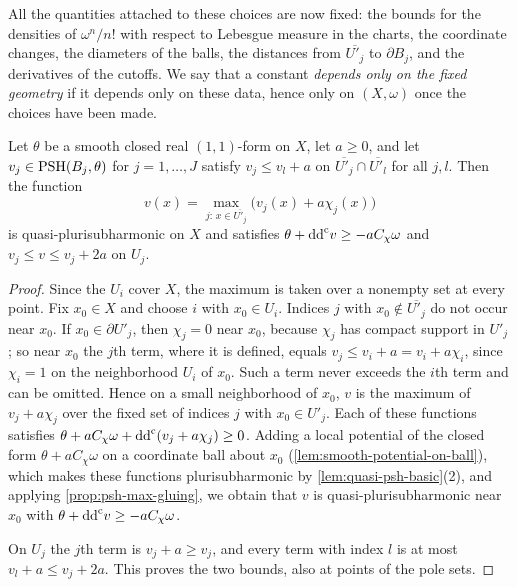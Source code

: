 All the quantities attached to these choices are now fixed: the bounds for the densities of $\omega^n/n!$ with respect to Lebesgue measure in the charts, the coordinate changes, the diameters of the balls, the distances from $\overline{U'_j}$ to $\partial B_j$, and the derivatives of the cutoffs. We say that a constant \emph{depends only on the fixed geometry} if it depends only on these data, hence only on $(X,\omega)$ once the choices have been made.

\begin{lemma}\label{lem:maximum-cutoff-patching}
Let $\theta$ be a smooth closed real $(1,1)$-form on $X$, let $a\geq0$, and let $v_j\in\mathrm{PSH}(B_j,\theta)$ for $j=1,\ldots,J$ satisfy $v_j\leq v_l+a$ on $\overline{U'_j}\cap\overline{U'_l}$ for all $j,l$. Then the function
\[
 v(x)=\max_{j:\,x\in\overline{U'_j}}\bigl(v_j(x)+a\chi_j(x)\bigr)
\]
is quasi-plurisubharmonic on $X$ and satisfies $\theta+\mathrm{dd}^{\mathrm{c}} v\geq-aC_\chi\omega$ and $v_j\leq v\leq v_j+2a$ on $U_j$.
\end{lemma}
\begin{proof}
Since the $U_i$ cover $X$, the maximum is taken over a nonempty set at every point. Fix $x_0\in X$ and choose $i$ with $x_0\in U_i$. Indices $j$ with $x_0\notin\overline{U'_j}$ do not occur near $x_0$. If $x_0\in\partial U'_j$, then $\chi_j=0$ near $x_0$, because $\chi_j$ has compact support in $U'_j$; so near $x_0$ the $j$th term, where it is defined, equals $v_j\leq v_i+a=v_i+a\chi_i$, since $\chi_i=1$ on the neighborhood $U_i$ of $x_0$. Such a term never exceeds the $i$th term and can be omitted. Hence on a small neighborhood of $x_0$, $v$ is the maximum of $v_j+a\chi_j$ over the fixed set of indices $j$ with $x_0\in U'_j$. Each of these functions satisfies $\theta+aC_\chi\omega+\mathrm{dd}^{\mathrm{c}}(v_j+a\chi_j)\geq0$. Adding a local potential of the closed form $\theta+aC_\chi\omega$ on a coordinate ball about $x_0$ (\cref{lem:smooth-potential-on-ball}), which makes these functions plurisubharmonic by \cref{lem:quasi-psh-basic}(2), and applying \cref{prop:psh-max-gluing}, we obtain that $v$ is quasi-plurisubharmonic near $x_0$ with $\theta+\mathrm{dd}^{\mathrm{c}} v\geq-aC_\chi\omega$.

On $U_j$ the $j$th term is $v_j+a\geq v_j$, and every term with index $l$ is at most $v_l+a\leq v_j+2a$. This proves the two bounds, also at points of the pole sets.
\end{proof}

